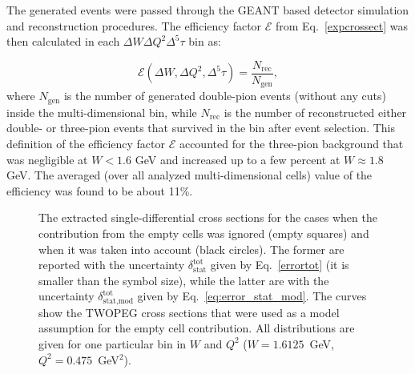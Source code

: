 \documentclass[prc,twocolumn,superscriptaddress,showpacs,amssymb,amsmath,amsfonts,aps,nofootinbib]{revtex4-1}
\begin{document}
The generated events were passed through the GEANT based detector simulation and reconstruction procedures. The efficiency factor $\mathcal{E}$ from Eq.~\eqref{expcrossect} was then calculated in each $\Delta W\Delta Q^{2}\Delta^{5} \tau$ bin as:

\begin{equation}
\mathcal{E}(\Delta W, \Delta Q^{2}, \Delta^{5} \tau) = \frac{N_{\text{rec}}}{N_{\text{gen}}},
\label{efficiency}
\end{equation}
where $N_{\text{gen}}$ is the number of generated double-pion events (without any cuts) inside the multi-dimensional bin, while $N_{\text{rec}}$ is the number of reconstructed either double- or three-pion events that survived in the bin after event selection. This definition of the efficiency factor $\mathcal{E}$ accounted for the three-pion background that was negligible at $W < 1.6$ GeV  and
increased up to a few percent at $W \approx 1.8$ GeV. The averaged (over all analyzed multi-dimensional cells) value of the efficiency was found to be about 11\%.

\begin{figure}[htp]
\begin{center}
\caption{\small The extracted single-differential cross sections  for the cases when the contribution from the empty cells was ignored (empty squares) and when it was taken into account (black circles). The former are reported with the uncertainty $\delta_{\text{stat}}^{\text{tot}}$ given by Eq.~\eqref{errortot} (it is smaller than the symbol size), while the latter are with the uncertainty $\delta_{\text{stat,mod}}^{\text{tot}}$ given by Eq.~\eqref{eq:error_stat_mod}.
The curves show the TWOPEG cross sections that were used as a model assumption for the empty cell contribution. All distributions are given for one particular bin in $W$ and $Q^2$ ($W = 1.6125$~GeV, $Q^2 = 0.475$~GeV$^2$).} \label{fig:topologies}
\end{center}
\end{figure}
\end{document}
